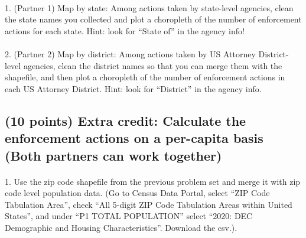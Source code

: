 \documentclass[
  letterpaper,
  DIV=11,
  numbers=noendperiod]{scrartcl}
\makeatletter
\let\oldparagraph\paragraph
\renewcommand{\paragraph}{
    \@ifstar
      \xxxParagraphStar
      \xxxParagraphNoStar
  }
\newcommand{\xxxParagraphStar}[1]{\oldparagraph*{#1}\mbox{}}
\newcommand{\xxxParagraphNoStar}[1]{\oldparagraph{#1}\mbox{}}
\makeatother
\begin{document}
\paragraph{1. (Partner 1) Map by state: Among actions taken by
state-level agencies, clean the state names you collected and plot a
choropleth of the number of enforcement actions for each state. Hint:
look for ``State of'' in the agency
info!}\label{partner-1-map-by-state-among-actions-taken-by-state-level-agencies-clean-the-state-names-you-collected-and-plot-a-choropleth-of-the-number-of-enforcement-actions-for-each-state.-hint-look-for-state-of-in-the-agency-info}

\paragraph{2. (Partner 2) Map by district: Among actions taken by US
Attorney District-level agencies, clean the district names so that you
can merge them with the shapefile, and then plot a choropleth of the
number of enforcement actions in each US Attorney District. Hint: look
for ``District'' in the agency
info.}\label{partner-2-map-by-district-among-actions-taken-by-us-attorney-district-level-agencies-clean-the-district-names-so-that-you-can-merge-them-with-the-shapefile-and-then-plot-a-choropleth-of-the-number-of-enforcement-actions-in-each-us-attorney-district.-hint-look-for-district-in-the-agency-info.}

\subsection{(10 points) Extra credit: Calculate the enforcement actions
on a per-capita basis (Both partners can work
together)}\label{points-extra-credit-calculate-the-enforcement-actions-on-a-per-capita-basis-both-partners-can-work-together}

\paragraph{1. Use the zip code shapefile from the previous problem set
and merge it with zip code level population data. (Go to Census Data
Portal, select ``ZIP Code Tabulation Area'', check ``All 5-digit ZIP
Code Tabulation Areas within United States'', and under ``P1 TOTAL
POPULATION'' select ``2020: DEC Demographic and Housing
Characteristics''. Download the
csv.).}\label{use-the-zip-code-shapefile-from-the-previous-problem-set-and-merge-it-with-zip-code-level-population-data.-go-to-census-data-portal-select-zip-code-tabulation-area-check-all-5-digit-zip-code-tabulation-areas-within-united-states-and-under-p1-total-population-select-2020-dec-demographic-and-housing-characteristics.-download-the-csv..}
\end{document}
